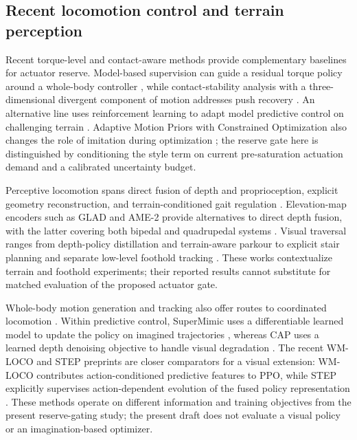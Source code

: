 \documentclass[11pt,a4paper]{article}
\begin{document}
\subsection{Recent locomotion control and terrain perception}
Recent torque-level and contact-aware methods provide complementary baselines for actuator reserve. Model-based supervision can guide a residual torque policy around a whole-body controller \cite{yanTorque2026}, while contact-stability analysis with a three-dimensional divergent component of motion addresses push recovery \cite{schullerDcm2026}. An alternative line uses reinforcement learning to adapt model predictive control on challenging terrain \cite{adaptiveMpc2026}. Adaptive Motion Priors with Constrained Optimization also changes the role of imitation during optimization \cite{ampco2026}; the reserve gate here is distinguished by conditioning the style term on current pre-saturation actuation demand and a calibrated uncertainty budget.

Perceptive locomotion spans direct fusion of depth and proprioception, explicit geometry reconstruction, and terrain-conditioned gait regulation \cite{cref2026,dpl2026,gaitdepth2026}. Elevation-map encoders such as GLAD and AME-2 provide alternatives to direct depth fusion, with the latter covering both bipedal and quadrupedal systems \cite{glad2026,ame22026}. Visual traversal ranges from depth-policy distillation and terrain-aware parkour to explicit stair planning and separate low-level foothold tracking \cite{rawpixels2026,php2026,hiking2026,polygmap2026,mindsteps2026}. These works contextualize terrain and foothold experiments; their reported results cannot substitute for matched evaluation of the proposed actuator gate.

Whole-body motion generation and tracking also offer routes to coordinated locomotion \cite{mgmt2026,beyondMimic2026,sonic2026}. Within predictive control, SuperMimic uses a differentiable learned model to update the policy on imagined trajectories \cite{supermimic2026}, whereas CAP uses a learned depth denoising objective to handle visual degradation \cite{cap2026}. The recent WM-LOCO and STEP preprints are closer comparators for a visual extension: WM-LOCO contributes action-conditioned predictive features to PPO, while STEP explicitly supervises action-dependent evolution of the fused policy representation \cite{wmloco2026,step2026}. These methods operate on different information and training objectives from the present reserve-gating study; the present draft does not evaluate a visual policy or an imagination-based optimizer.
\end{document}
